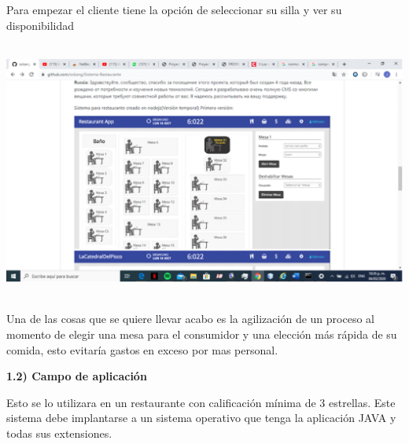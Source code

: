 \documentclass{article} %
\begin{document}
\noindent Para empezar el cliente tiene la opci\'{o}n de seleccionar su silla y ver su disponibilidad 

\noindent \includegraphics*[width=5.46in, height=3.35in, keepaspectratio=false, trim=2.02in 0.78in 4.34in 1.38in]{image2}

\noindent 

\noindent 

\noindent 

\noindent 

\noindent 

\noindent 

\noindent 

\noindent 

\noindent 

\noindent 

\noindent Una de las cosas que se quiere llevar acabo es la agilizaci\'{o}n de un proceso al momento de elegir    una mesa para el consumidor y una elecci\'{o}n m\'{a}s r\'{a}pida de su comida, esto evitar\'{i}a gastos en exceso por mas personal.

\noindent 

\noindent \textbf{ 1.2) Campo de aplicaci\'{o}n}

\noindent   Esto se lo utilizara en un restaurante con calificaci\'{o}n m\'{i}nima de 3 estrellas. Este sistema   debe implantarse a un sistema operativo que tenga la aplicaci\'{o}n JAVA y todas sus extensiones.

\noindent 
\end{document}
